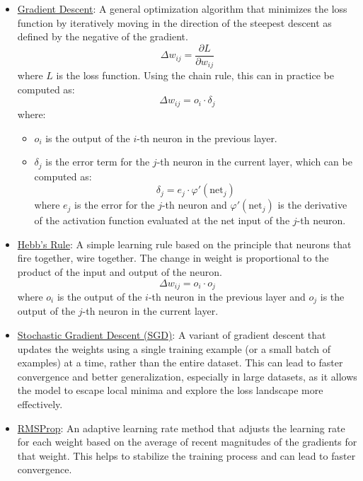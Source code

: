 \begin{itemize}
    \item \ul{Gradient Descent}: A general optimization algorithm that minimizes the loss function by iteratively moving in the direction of the steepest descent as defined by the negative of the gradient.
     \begin{equation*}
        \Delta w_{ij} = \dfrac{\partial L}{\partial w_{ij}}
    \end{equation*}
        where $L$ is the loss function. Using the chain rule, this can in practice be computed as:
    \begin{equation*}
        \Delta w_{ij} = o_i\cdot \delta_j
    \end{equation*}
    where:
    \begin{itemize}
        \item $o_i$ is the output of the $i$-th neuron in the previous layer.
        \item $\delta_j$ is the error term for the $j$-th neuron in the current layer, which can be computed as:
        \begin{equation*}
            \delta_j = e_j \cdot \varphi'(\text{net}_j)
        \end{equation*}
        where $e_j$ is the error for the $j$-th neuron and $\varphi'(\text{net}_j)$ is the derivative of the activation function evaluated at the net input of the $j$-th neuron.
    \end{itemize}
    \item \ul{Hebb's Rule}: A simple learning rule based on the principle that neurons that fire together, wire together. The change in weight is proportional to the product of the input and output of the neuron.
    \begin{equation*}
        \Delta w_{ij} = o_i \cdot o_j
    \end{equation*}
    where $o_i$ is the output of the $i$-th neuron in the previous layer and $o_j$ is the output of the $j$-th neuron in the current layer.
    \item \ul{Stochastic Gradient Descent (SGD)}: A variant of gradient descent that updates the weights using a single training example (or a small batch of examples) at a time, rather than the entire dataset. This can lead to faster convergence and better generalization, especially in large datasets, as it allows the model to escape local minima and explore the loss landscape more effectively.
    \item \ul{RMSProp}: An adaptive learning rate method that adjusts the learning rate for each weight based on the average of recent magnitudes of the gradients for that weight. This helps to stabilize the training process and can lead to faster convergence.

\end{itemize}
